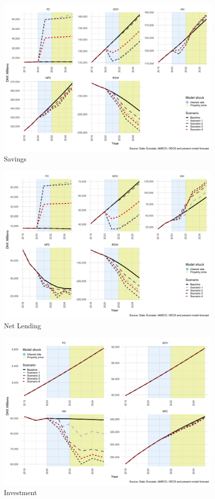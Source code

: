 \documentclass[
]{book}
\begin{document}
\begin{figure}[H]
\includegraphics[width=0.95\linewidth]{figures/fl-fi-sfc-Savings-extra-1} \caption{Savings}\label{fig:fl-fi-sfc-Savings-extra}
\end{figure}

\begin{figure}[H]
\includegraphics[width=0.95\linewidth]{figures/fl-fi-sfc-Yd-extra-1} \caption{Net Lending}\label{fig:fl-fi-sfc-Yd-extra}
\end{figure}

\begin{figure}[H]
\includegraphics[width=0.95\linewidth]{figures/fl-fi-sfc-INV-extra-1} \caption{Investment}\label{fig:fl-fi-sfc-INV-extra}
\end{figure}
\end{document}
